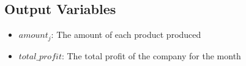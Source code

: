 \documentclass{article}
\begin{document}
\subsection*{Output Variables}
\begin{itemize}
    \item $amount_j$: The amount of each product produced
    \item $total\_profit$: The total profit of the company for the month
\end{itemize}
\end{document}
